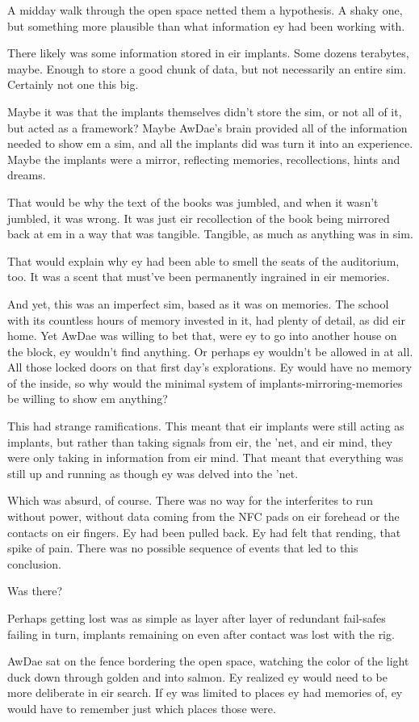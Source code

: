 A midday walk through the open space netted them a hypothesis. A shaky one, but something more plausible than what information ey had been working with.

There likely was some information stored in eir implants. Some dozens terabytes, maybe. Enough to store a good chunk of data, but not necessarily an entire sim. Certainly not one this big.

Maybe it was that the implants themselves didn't store the sim, or not all of it, but acted as a framework? Maybe AwDae's brain provided all of the information needed to show em a sim, and all the implants did was turn it into an experience. Maybe the implants were a mirror, reflecting memories, recollections, hints and dreams.

That would be why the text of the books was jumbled, and when it wasn't jumbled, it was wrong. It was just eir recollection of the book being mirrored back at em in a way that was tangible. Tangible, as much as anything was in sim.

That would explain why ey had been able to smell the seats of the auditorium, too. It was a scent that must've been permanently ingrained in eir memories.

And yet, this was an imperfect sim, based as it was on memories. The school with its countless hours of memory invested in it, had plenty of detail, as did eir home. Yet AwDae was willing to bet that, were ey to go into another house on the block, ey wouldn't find anything. Or perhaps ey wouldn't be allowed in at all. All those locked doors on that first day's explorations. Ey would have no memory of the inside, so why would the minimal system of implants-mirroring-memories be willing to show em anything?

This had strange ramifications. This meant that eir implants were still acting as implants, but rather than taking signals from eir, the 'net, and eir mind, they were only taking in information from eir mind. That meant that everything was still up and running as though ey was delved into the 'net.

Which was absurd, of course. There was no way for the interferites to run without power, without data coming from the NFC pads on eir forehead or the contacts on eir fingers. Ey had been pulled back. Ey had felt that rending, that spike of pain. There was no possible sequence of events that led to this conclusion.

Was there?

Perhaps getting lost was as simple as layer after layer of redundant fail-safes failing in turn, implants remaining on even after contact was lost with the rig.

AwDae sat on the fence bordering the open space, watching the color of the light duck down through golden and into salmon. Ey realized ey would need to be more deliberate in eir search. If ey was limited to places ey had memories of, ey would have to remember just which places those were.
